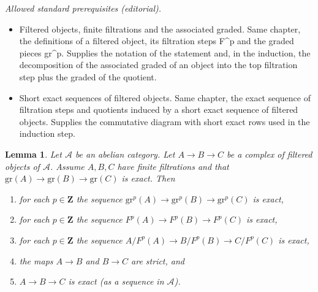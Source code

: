 \documentclass[10pt,a4paper]{amsart}
\theoremstyle{plain}
\newtheorem{lemma}[subsection]{Lemma}
\theoremstyle{definition}
\theoremstyle{remark}
\numberwithin{equation}{subsection}
\begin{document}
\noindent\textit{Allowed standard prerequisites (editorial).}\begin{itemize}
\item Filtered objects, finite filtrations and the associated graded. Same chapter, the definitions of a filtered object, its filtration steps F\textasciicircum{}p and the graded pieces gr\textasciicircum{}p. Supplies the notation of the statement and, in the induction, the decomposition of the associated graded of an object into the top filtration step plus the graded of the quotient.
\item Short exact sequences of filtered objects. Same chapter, the exact sequence of filtration steps and quotients induced by a short exact sequence of filtered objects. Supplies the commutative diagram with short exact rows used in the induction step.
\end{itemize}\medskip
\begin{lemma}
\label{lemma-filtered-acyclic}
Let $\mathcal{A}$ be an abelian category.
Let $A \to B \to C$ be a complex of filtered objects of $\mathcal{A}$.
Assume $A, B, C$ have finite filtrations and that
$\text{gr}(A) \to \text{gr}(B) \to \text{gr}(C)$ is exact.
Then
\begin{enumerate}
\item for each $p \in \mathbf{Z}$ the sequence
$\text{gr}^p(A) \to \text{gr}^p(B) \to \text{gr}^p(C)$ is exact,
\item for each $p \in \mathbf{Z}$ the sequence
$F^p(A) \to F^p(B) \to F^p(C)$ is exact,
\item for each $p \in \mathbf{Z}$ the sequence
$A/F^p(A) \to B/F^p(B) \to C/F^p(C)$ is exact,
\item the maps $A \to B$ and $B \to C$ are strict, and
\item $A \to B \to C$ is exact (as a sequence in $\mathcal{A}$).
\end{enumerate}
\end{lemma}
\end{document}
